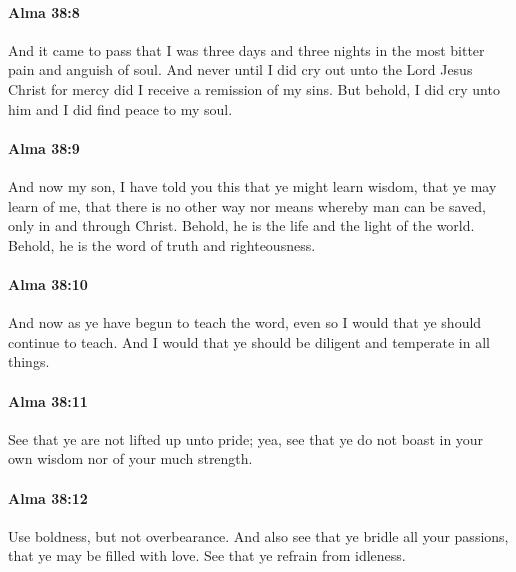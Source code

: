 		\paragraph{Alma 38:8} %
			\label{ALMA-38-8}

			And it came to pass that I was three days and three nights
			in the most bitter pain and anguish of soul.
			And never until I did cry out unto the Lord Jesus Christ for mercy
			did I receive a remission of my sins.
			But behold, I did cry unto him and I did find peace to my soul.

		\paragraph{Alma 38:9} %
			\label{ALMA-38-9}

			And now my son, I have told you this that ye might learn wisdom,
			that ye may learn of me,
			that there is no other way nor means whereby man can be saved,
			only in and through Christ.
			Behold, he is the life and the light of the world.
			Behold, he is the word of truth and righteousness.

		\paragraph{Alma 38:10} %
			\label{ALMA-38-10}

			And now as ye have begun to teach the word,
			even so I would that ye should continue to teach.
			And I would that ye should be diligent and temperate in all things.

		\paragraph{Alma 38:11} %
			\label{ALMA-38-11}

			See that ye are not lifted up unto pride;
			yea, see that ye do not boast in your own wisdom nor of your much strength.

		\paragraph{Alma 38:12} %
			\label{ALMA-38-12}

			Use boldness, but not overbearance.
			And also see that ye bridle all your passions,
			that ye may be filled with love.
			See that ye refrain from idleness.

